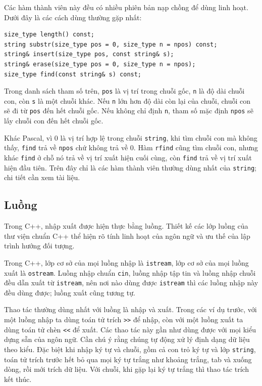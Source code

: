 \documentclass[11pt]{article}
\newcommand{\cpp}{C++}
\newcommand{\pascal}{Pascal}
\begin{document}
Các hàm thành viên này đều có nhiều phiên bản nạp chồng để dùng linh hoạt.
Dưới đây là các cách dùng thường gặp nhất:

\begin{verbatim}
size_type length() const;
string substr(size_type pos = 0, size_type n = npos) const;
string& insert(size_type pos, const string& s);
string& erase(size_type pos = 0, size_type n = npos);
size_type find(const string& s) const;
\end{verbatim}

Trong danh sách tham số trên, \verb|pos| là vị trí trong chuỗi gốc,
\verb|n| là độ dài chuỗi con, còn \verb|s| là một chuỗi khác. Nếu \verb|n|
lớn hơn độ dài còn lại của chuỗi, chuỗi con sẽ đi từ \verb|pos| đến hết chuỗi
gốc. Nếu không chỉ định \verb|n|, tham số mặc định \verb|npos| sẽ lấy chuỗi
con đến hết chuỗi gốc.

Khác \pascal{}, vì \(0\) là vị trí hợp lệ trong chuỗi \verb|string|, khi tìm
chuỗi con mà không thấy, \verb|find| trả về \verb|npos| chứ không trả về
\(0\). Hàm \verb|rfind| cũng tìm chuỗi con, nhưng khác \verb|find| ở chỗ nó
trả về vị trí xuất hiện cuối cùng, còn \verb|find| trả về vị trí xuất hiện
đầu tiên. Trên đây chỉ là các hàm thành viên thường dùng nhất của
\verb|string|; chi tiết cần xem tài liệu.

\subsection{Luồng}

Trong \cpp{}, nhập xuất được hiện thực bằng luồng. Thiết kế các lớp luồng của
thư viện chuẩn \cpp{} thể hiện rõ tính linh hoạt của ngôn ngữ và ưu thế của
lập trình hướng đối tượng.

Trong \cpp{}, lớp cơ sở của mọi luồng nhập là \verb|istream|, lớp cơ sở của
mọi luồng xuất là \verb|ostream|. Luồng nhập chuẩn \verb|cin|, luồng nhập tập
tin và luồng nhập chuỗi đều dẫn xuất từ \verb|istream|, nên nơi nào dùng được
\verb|istream| thì các luồng nhập này đều dùng được; luồng xuất cũng tương tự.

Thao tác thường dùng nhất với luồng là nhập và xuất. Trong các ví dụ trước,
với một luồng nhập ta dùng toán tử trích \verb|>>| để nhập, còn với một luồng
xuất ta dùng toán tử chèn \verb|<<| để xuất. Các thao tác này gần như dùng
được với mọi kiểu dựng sẵn của ngôn ngữ. Cần chú ý rằng chúng tự động xử lý
định dạng dữ liệu theo kiểu. Đặc biệt khi nhập ký tự và chuỗi, gồm cả con trỏ
ký tự và lớp \verb|string|, toán tử trích trước hết bỏ qua mọi ký tự trắng
như khoảng trắng, tab và xuống dòng, rồi mới trích dữ liệu. Với chuỗi, khi gặp
lại ký tự trắng thì thao tác trích kết thúc.
\end{document}
